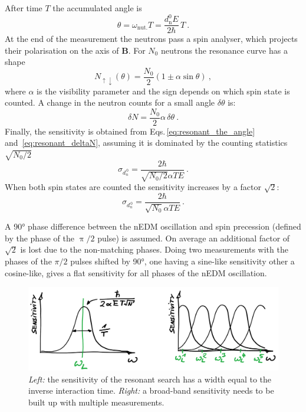 After time $T$ the accumulated angle is
\begin{equation}
  \theta = \omega_\text{nut.} T = \frac{d_\text{n}^0 E }{2 \hbar} \, T \ .
  \label{eq:resonant_the_angle}
\end{equation}
At the end of the measurement the neutrons pass a spin analyser, which projects their polarisation on the axis of $\mathbf{B}$.
For $N_0$ neutrons the resonance curve has a shape
\begin{equation}
  N_{\uparrow \downarrow}(\theta) = \frac{N_0}{2} \left( 1 \pm \alpha \sin \theta  \right)  \ ,
\end{equation}
where $\alpha$ is the visibility parameter and the sign depends on which spin state is counted.
A change in the neutron counts for a small angle $\delta \theta$ is:
\begin{equation}
  \delta N = \frac{N_0}{2} \alpha \, \delta \theta \ .
  \label{eq:resonant_deltaN}
\end{equation}
Finally, the sensitivity is obtained from Eqs.\,\ref{eq:resonant_the_angle} and~\ref{eq:resonant_deltaN}, assuming it is dominated by the counting statistics $\sqrt{N_0/2}$
\begin{equation}
  \sigma_{d_n^{\,0}} = \frac{2 \hbar}{\sqrt{N_0/2} \alpha T E} \ .
\end{equation}
When both spin states are counted the sensitivity increases by a factor $\sqrt{2}$:
\begin{equation}
  \sigma_{d_n^{\,0}} = \frac{2 \hbar}{\sqrt{N_0} \alpha T E} \ .
\end{equation}

A \ang{90} phase difference between the nEDM oscillation and spin precession (defined by the phase of the $\uppi/2$ pulse) is assumed.
On average an additional factor of $\sqrt{2}$ is lost due to the non-matching phases.
Doing two measurements with the phases of the $\pi/2$ pulses shifted by \ang{90}, one having a sine-like sensitivity other a cosine-like, gives a flat sensitivity for all phases of the nEDM oscillation.

\begin{figure}
  \centering
  \includegraphics[width=\linewidth]{gfx/axions/resonant_sensitivity.png}
  \caption{\emph{Left:} the sensitivity of the resonant search has a width equal to the inverse interaction time.
  \emph{Right:} a broad-band sensitivity needs to be built up with multiple measurements.}\label{fig:axions_resonant_sensitivity}
\end{figure}

